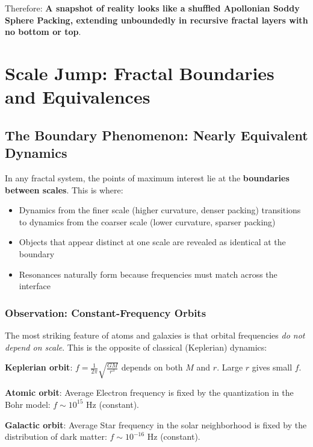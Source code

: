 \documentclass[11pt,a4paper]{article}
\begin{document}
  Therefore: \textbf{A snapshot of reality looks like a shuffled Apollonian Soddy Sphere Packing, extending unboundedly in recursive fractal layers with no bottom or top}.


\section{Scale Jump: Fractal Boundaries and Equivalences}

  \subsection{The Boundary Phenomenon: Nearly Equivalent Dynamics}

    In any fractal system, the points of maximum interest lie at the \textbf{boundaries between scales}. This is where:

    \begin{itemize}
    \item Dynamics from the finer scale (higher curvature, denser packing) transitions to dynamics from the coarser scale (lower curvature, sparser packing)
    \item Objects that appear distinct at one scale are revealed as identical at the boundary
    \item Resonances naturally form because frequencies must match across the interface
    \end{itemize}

  \subsubsection{Observation: Constant-Frequency Orbits}

    The most striking feature of atoms and galaxies is that orbital frequencies \textit{do not depend on scale}. This is the opposite of classical (Keplerian) dynamics:

    \textbf{Keplerian orbit}: $f = \frac{1}{2\pi}\sqrt{\frac{GM}{r^3}}$ depends on both $M$ and $r$. Large $r$ gives small $f$.

    \textbf{Atomic orbit}: Average Electron frequency is fixed by the quantization in the Bohr model: $f \sim 10^{15}$ Hz (constant).

    \textbf{Galactic orbit}: Average Star frequency in the solar neighborhood is fixed by the distribution of dark matter: $f \sim 10^{-16}$ Hz (constant).
\end{document}
